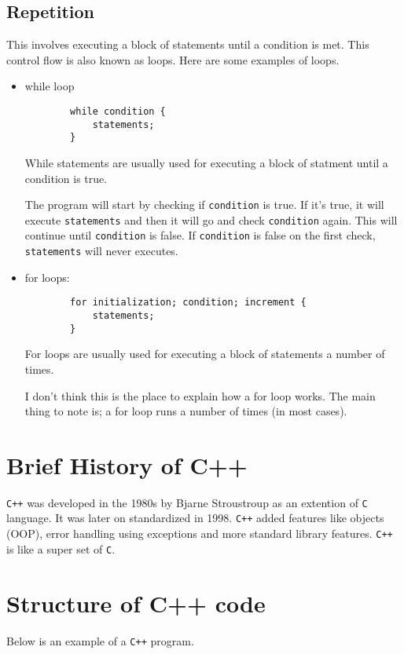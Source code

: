 \documentclass{book}
\begin{document}
\subsection{Repetition}
This involves executing a block of statements until a condition is met. This control flow is also known as loops. Here are some examples of loops.

\begin{itemize}
	\item while loop

		\begin{verbatim}
		while condition {
			statements;
		}
		\end{verbatim}

		While statements are usually used for executing a block of statment until a condition is true.

		The program will start by checking if \verb|condition| is true. If it's true, it will execute \verb|statements| and then it will go and check \verb|condition| again. This will continue until \verb|condition| is false. If \verb|condition| is false on the first check, \verb|statements| will never executes.

	\item for loops:

		\begin{verbatim}
		for initialization; condition; increment {
			statements;
		}
		\end{verbatim}

		For loops are usually used for executing a block of statements a number of times.

		I don't think this is the place to explain how a for loop works. The main thing to note is; a for loop runs a number of times (in most cases).
\end{itemize}

\section{Brief History of C++}
\verb|C++| was developed in the 1980s by Bjarne Stroustroup as an extention of \verb|C| language. It was later on standardized in 1998. \verb|C++| added features like objects (OOP), error handling using exceptions and more standard library features. \verb|C++| is like a super set of \verb|C|.

\section{Structure of C++ code}
Below is an example of a \verb|C++| program.
\end{document}
